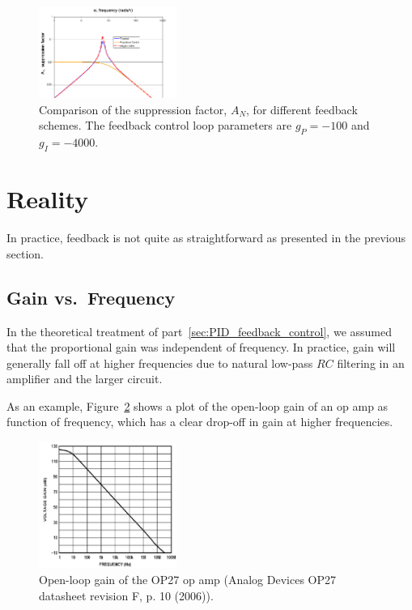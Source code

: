\documentclass{article}
\begin{document}
\begin{figure}
\begin{center}
\includegraphics[width=0.4\textwidth]{pics/PI_noise_suppression}
\end{center}
\caption{Comparison of the suppression factor, $A_N$, for different feedback schemes. The feedback control loop parameters are $g_P = -100$ and $g_I = -4000$.}
\label{fig:PI_noise_suppression}
\end{figure}

\section{Reality}
In practice, feedback is not quite as straightforward as presented in the previous section. 

\subsection{Gain vs.~Frequency}
In the theoretical treatment of part~\ref{sec:PID_feedback_control}, we assumed that the proportional gain was independent of frequency. In practice, gain will generally fall off at higher frequencies due to natural low-pass $RC$ filtering in an amplifier and the larger circuit.

As an example, Figure~\ref{fig:OP27_open_loop_gain} shows a plot of the open-loop gain of an op amp as function of frequency, which has a clear drop-off in gain at higher frequencies.

\begin{figure}
\begin{center}
\includegraphics[width=0.4\textwidth]{pics/OP27_open_loop_gain}
\end{center}
\caption{Open-loop gain of the OP27 op amp (Analog Devices OP27 datasheet revision F, p. 10 (2006)).}
\label{fig:OP27_open_loop_gain}
\end{figure}
\end{document}
